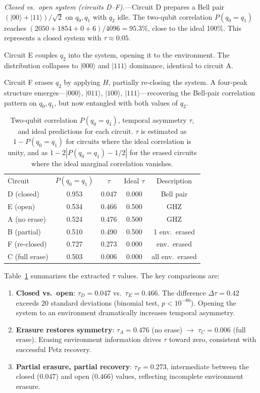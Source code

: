 \documentclass[prl,twocolumn,superscriptaddress,longbibliography,floatfix]{revtex4-2}
\newcommand{\ket}[1]{|#1\rangle}
\newcommand{\tauasym}{\tau}
\begin{document}
\textit{Closed vs.\ open system (circuits D--F).}---Circuit D
prepares a Bell pair $(\ket{00}+\ket{11})/\sqrt{2}$ on $q_0,q_1$
with $q_2$ idle.  The two-qubit correlation $P(q_0 = q_1)$ reaches
$(2050+1854+0+6)/4096 = 95.3\%$, close to the ideal 100\%.  This
represents a closed system with $\tauasym \approx 0.05$.

Circuit E couples $q_2$ into the system, opening it to the
environment.  The distribution collapses to $\ket{000}$ and
$\ket{111}$ dominance, identical to circuit A.

Circuit F erases $q_2$ by applying $H$, partially re-closing the
system.  A four-peak structure emerges---$\ket{000}$, $\ket{011}$,
$\ket{100}$, $\ket{111}$---recovering the Bell-pair correlation
pattern on $q_0,q_1$, but now entangled with both values of $q_2$.

\begin{table}[b]
\caption{\label{tab:tau}Two-qubit correlation $P(q_0{=}q_1)$,
temporal asymmetry $\tauasym$, and ideal predictions for each circuit.
$\tauasym$ is estimated as $1 - P(q_0{=}q_1)$ for circuits where the
ideal correlation is unity, and as $1 - 2|P(q_0{=}q_1) - 1/2|$ for
the erased circuits where the ideal marginal correlation vanishes.}
\begin{ruledtabular}
\begin{tabular}{lcccc}
\textrm{Circuit} & $P(q_0{=}q_1)$ & $\tauasym$ & Ideal $\tauasym$
  & Description \\
\colrule
D (closed)    & 0.953 & 0.047 & 0.000 & Bell pair \\
E (open)      & 0.534 & 0.466 & 0.500 & GHZ \\
A (no erase)  & 0.524 & 0.476 & 0.500 & GHZ \\
B (partial)   & 0.510 & 0.490 & 0.500 & 1 env.\ erased \\
F (re-closed) & 0.727 & 0.273 & 0.000 & env.\ erased \\
C (full erase)& 0.503 & 0.006 & 0.000 & all env.\ erased \\
\end{tabular}
\end{ruledtabular}
\end{table}

Table~\ref{tab:tau} summarizes the extracted $\tauasym$ values.  The
key comparisons are:
\begin{enumerate}
  \item \textbf{Closed vs.\ open}: $\tauasym_D = 0.047$ vs.\
    $\tauasym_E = 0.466$.  The difference $\Delta\tauasym = 0.42$
    exceeds 20 standard deviations (binomial test, $p < 10^{-80}$).
    Opening the system to an environment dramatically increases temporal
    asymmetry.
  \item \textbf{Erasure restores symmetry}: $\tauasym_A = 0.476$
    (no erase) $\to$ $\tauasym_C = 0.006$ (full erase).  Erasing
    environment information drives $\tauasym$ toward zero,
    consistent with successful Petz recovery.
  \item \textbf{Partial erasure, partial recovery}: $\tauasym_F =
    0.273$, intermediate between the closed ($0.047$) and open
    ($0.466$) values, reflecting incomplete environment erasure.
\end{enumerate}
\end{document}
